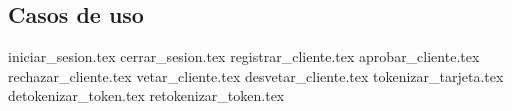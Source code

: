 %
%
%

\subsection{Casos de uso}

{iniciar_sesion.tex}
{cerrar_sesion.tex}
{registrar_cliente.tex}
{aprobar_cliente.tex}
{rechazar_cliente.tex}
{vetar_cliente.tex}
{desvetar_cliente.tex}
{tokenizar_tarjeta.tex}
{detokenizar_token.tex}
{retokenizar_token.tex}
